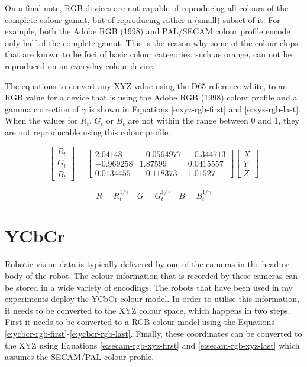 On a final note, RGB devices are not capable of reproducing all
colours of the complete colour gamut, but of reproducing rather a
(small) subset of it. For example, both the Adobe RGB (1998) and
PAL/SECAM colour profile encode only half of the complete gamut. This
is the reason why some of the colour chips that are known to be foci
of basic colour categories, such as orange, can not be reproduced on
an everyday colour device.

The equations to convert any XYZ value using the D65 reference white,
to an RGB value for a device that is using the Adobe RGB (1998) colour
profile and a gamma correction of $\gamma$ is shown in Equations
\ref{e:xyz-rgb-first} and \ref{e:xyz-rgb-last}. When the values for
$R_t$, $G_t$ or $B_t$ are not within the range between 0 and 1, they
are not reproducable using this colour profile.

\begin{equation}
\begin{bmatrix}
  R_t \\ G_t \\ B_t
\end{bmatrix}
=
\begin{bmatrix}
 2.04148 & -0.0564977 & -0.344713 \\
-0.969258 & 1.87599& 0.0415557 \\
0.0134455  &  -0.118373 & 1.01527
\end{bmatrix}
\begin{bmatrix}
  X \\ Y \\ Z
\end{bmatrix}
\label{e:xyz-rgb-first}
\end{equation}

\begin{equation}
R = R_t^{1/\gamma} \quad G = G_t^{1/\gamma} \quad B = B_t^{1/\gamma}
\label{e:xyz-rgb-last}
\end{equation}

\section{YCbCr}
\label{s:ycbcr}

Robotic vision data is typically delivered by one of the cameras in
the head or body of the robot. The colour information that is recorded
by these cameras can be stored in a wide variety of encodings. The
robots that have been used in my experiments deploy the YCbCr colour
model. In order to utilise this information, it needs to be converted
to the XYZ colour space, which happens in two steps. First it needs to
be converted to a RGB colour model using the Equations
\ref{e:ycbcr-rgb-first}-\ref{e:ycbcr-rgb-last}. Finally, these
coordinates can be converted to the XYZ using Equations
\ref{e:secam-rgb-xyz-first} and \ref{e:secam-rgb-xyz-last} which
assumes the SECAM/PAL colour profile.

